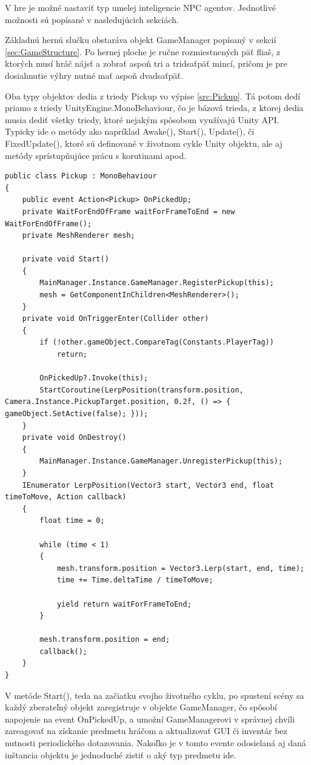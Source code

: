 \documentclass[slovak, master]{diploma}
\begin{document}
V hre je možné nastaviť typ umelej inteligencie NPC agentov. Jednotlivé možnosti sú popísané v nasledujúcich sekciách.

Základnú hernú slučku obstaráva objekt GameManager popísaný v sekcií \ref{sec:GameStructure}. Po hernej ploche je ručne rozmiestnených päť fliaš, z ktorých musí hráč nájsť a zobrať aspoň tri a tridsaťpäť mincí, pričom je pre dosiahnutie výhry nutné mať aspoň dvadsaťpäť. 

Oba typy objektov dedia z triedy Pickup vo výpise \ref{src:Pickup}. Tá potom dedí priamo z triedy UnityEngine.MonoBehaviour, čo je bázová trieda, z ktorej dedia musia dediť všetky triedy, ktoré nejakým spôsobom využívajú Unity API. Typicky ide o metódy ako napríklad Awake(), Start(), Update(), či FixedUpdate(), ktoré sú definované v životnom cykle Unity objektu, ale aj metódy sprístupňujúce prácu s korutinami apod.
\vspace{8pt}
\begin{lstlisting}[label=src:Pickup,caption={Trieda Pickup slúžiaca ako predok všetkých zberateľných predmetov v hre}]
public class Pickup : MonoBehaviour
{
    public event Action<Pickup> OnPickedUp;
    private WaitForEndOfFrame waitForFrameToEnd = new WaitForEndOfFrame();
    private MeshRenderer mesh;

    private void Start() 
    {
        MainManager.Instance.GameManager.RegisterPickup(this);
        mesh = GetComponentInChildren<MeshRenderer>();
    }
    private void OnTriggerEnter(Collider other) 
    {
        if (!other.gameObject.CompareTag(Constants.PlayerTag))
            return;

        OnPickedUp?.Invoke(this);
        StartCoroutine(LerpPosition(transform.position, Camera.Instance.PickupTarget.position, 0.2f, () => { gameObject.SetActive(false); }));
    }
    private void OnDestroy() 
    {
        MainManager.Instance.GameManager.UnregisterPickup(this);
    }
    IEnumerator LerpPosition(Vector3 start, Vector3 end, float timeToMove, Action callback) 
    {
        float time = 0;

        while (time < 1)
        {
            mesh.transform.position = Vector3.Lerp(start, end, time);
            time += Time.deltaTime / timeToMove;

            yield return waitForFrameToEnd;
        }

        mesh.transform.position = end;
        callback();
    }
}
\end{lstlisting}

V metóde Start(), teda na začiatku svojho životného cyklu, po spustení scény sa každý zberateľný objekt zaregistruje v objekte GameManager, čo spôsobí napojenie na event OnPickedUp, a umožní GameManagerovi v správnej chvíli zareagovať na získanie predmetu hráčom a aktualizovať GUI či inventár bez nutnosti periodického dotazovania. Nakoľko je v tomto evente odosielaná aj daná inštancia objektu je jednoduché zistiť o aký typ predmetu ide.
\end{document}
